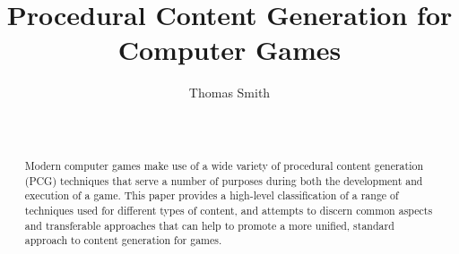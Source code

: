 \documentclass{acm_proc_article-sp}
\begin{document}
\title{Procedural Content Generation for Computer Games}

\author{
\alignauthor
Thomas Smith\\
       \\
       \\
}

\maketitle
\begin{abstract}
Modern computer games make use of a wide variety of procedural content generation (PCG) techniques that serve a number of purposes during both the development and execution of a game. This paper provides a high-level classification of a range of techniques used for different types of content, and attempts to discern common aspects and transferable approaches that can help to promote a more unified, standard approach to content generation for games. 






\end{abstract}
\end{document}
